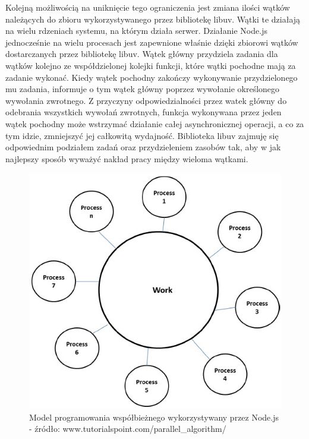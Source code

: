 \documentclass[12pt]{report}
\begin{document}
Kolejną możliwością na uniknięcie tego ograniczenia jest zmiana ilości wątków należących do zbioru wykorzystywanego przez bibliotekę libuv. 
Wątki te działają na wielu rdzeniach systemu, na którym działa serwer. 
Działanie Node.js jednocześnie na wielu procesach jest zapewnione właśnie dzięki zbiorowi wątków dostarczanych przez bibliotekę libuv.
Wątek główny przydziela zadania dla wątków kolejno ze współdzielonej kolejki funkcji, które wątki pochodne mają za zadanie wykonać. 
Kiedy wątek pochodny zakończy wykonywanie przydzielonego mu zadania, informuje o tym wątek główny poprzez wywołanie określonego wywołania zwrotnego. 
Z przyczyny odpowiedzialności przez watek główny do odebrania wszystkich wywołań zwrotnych, funkcja wykonywana przez jeden wątek pochodny może wstrzymać działanie całej asynchronicznej operacji, a co za tym idzie, zmniejszyć jej całkowitą wydajność. 
Biblioteka libuv zajmuję się odpowiednim podziałem zadań oraz przydzieleniem zasobów tak, aby w jak najlepszy sposób wyważyć nakład pracy między wieloma wątkami. 
\newpage
\begin{figure}[!hb]
\centering
\includegraphics[width=\textwidth,height=\textheight,keepaspectratio]{thread.png} 
\caption{Model programowania współbieżnego wykorzystywany przez Node.js - źródło: www.tutorialspoint.com/parallel\_algorithm/}
\end{figure}
\end{document}
